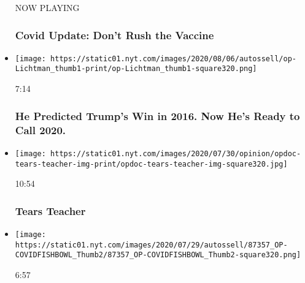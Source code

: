 \begin{itemize}
  NOW PLAYING

  \hypertarget{covid-update-dont-rush-the-vaccine-2}{%
  \subsubsection{Covid Update: Don't Rush the
  Vaccine}\label{covid-update-dont-rush-the-vaccine-2}}
\item
  \href{https://www.nytimes.com/video/opinion/100000007227782/2020-election-prediction-allan-lichtman.html?action=click\&module=video-series-bar\&region=header\&pgtype=Article\&playlistId=video/opinion}{}

  \texttt{[image: https://static01.nyt.com/images/2020/08/06/autossell/op-Lichtman\_thumb1-print/op-Lichtman\_thumb1-square320.png]}

  7:14

  \hypertarget{he-predicted-trumps-win-in-2016-now-hes-ready-to-call-2020}{%
  \subsubsection{He Predicted Trump's Win in 2016. Now He's Ready to
  Call
  2020.}\label{he-predicted-trumps-win-in-2016-now-hes-ready-to-call-2020}}
\item
  \href{https://www.nytimes.com/video/opinion/100000007247238/tears-teacher.html?action=click\&module=video-series-bar\&region=header\&pgtype=Article\&playlistId=video/opinion}{}

  \texttt{[image: https://static01.nyt.com/images/2020/07/30/opinion/opdoc-tears-teacher-img-print/opdoc-tears-teacher-img-square320.jpg]}

  10:54

  \hypertarget{tears-teacher}{%
  \subsubsection{Tears Teacher}\label{tears-teacher}}
\item
  \href{https://www.nytimes.com/video/opinion/100000007227777/covid-19-global-response.html?action=click\&module=video-series-bar\&region=header\&pgtype=Article\&playlistId=video/opinion}{}

  \texttt{[image: https://static01.nyt.com/images/2020/07/29/autossell/87357\_OP-COVIDFISHBOWL\_Thumb2/87357\_OP-COVIDFISHBOWL\_Thumb2-square320.png]}

  6:57

  \hypertarget{thats-ridiculous-how-americas-coronavirus-response-looks-abroad}{%
}
\end{itemize}
